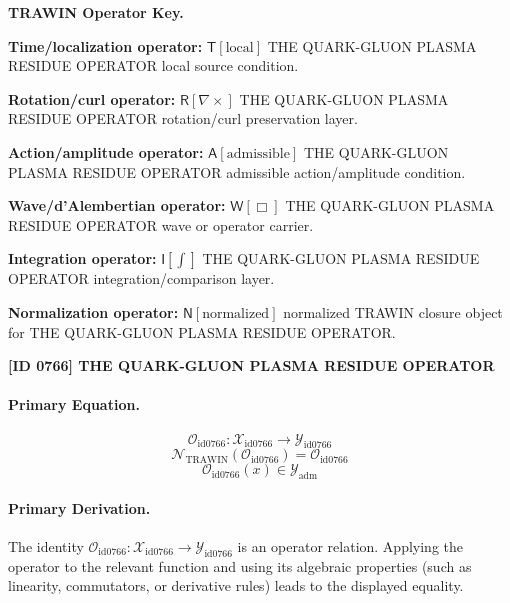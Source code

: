 \par\vspace{0.45\baselineskip}
\noindent\begin{minipage}[t]{\linewidth}
\begingroup
\small
\raggedright
\textbf{TRAWIN Operator Key.}\par
\noindent\textbf{Time/localization operator:} $\mathsf{T}\!\left[\mathrm{local}\right]$ THE QUARK-GLUON PLASMA RESIDUE OPERATOR local source condition.\par
\noindent\textbf{Rotation/curl operator:} $\mathsf{R}\!\left[\nabla\times\right]$ THE QUARK-GLUON PLASMA RESIDUE OPERATOR rotation/curl preservation layer.\par
\noindent\textbf{Action/amplitude operator:} $\mathsf{A}\!\left[\mathrm{admissible}\right]$ THE QUARK-GLUON PLASMA RESIDUE OPERATOR admissible action/amplitude condition.\par
\noindent\textbf{Wave/d'Alembertian operator:} $\mathsf{W}\!\left[\Box\right]$ THE QUARK-GLUON PLASMA RESIDUE OPERATOR wave or operator carrier.\par
\noindent\textbf{Integration operator:} $\mathsf{I}\!\left[\int\right]$ THE QUARK-GLUON PLASMA RESIDUE OPERATOR integration/comparison layer.\par
\noindent\textbf{Normalization operator:} $\mathsf{N}\!\left[\mathrm{normalized}\right]$ normalized TRAWIN closure object for THE QUARK-GLUON PLASMA RESIDUE OPERATOR.\par
\endgroup
\end{minipage}

\clearpage
\noindent\textbf{[ID 0766] THE QUARK-GLUON PLASMA RESIDUE OPERATOR}\par
\vspace{0.35em}
\paragraph{Primary Equation.}
\[
\mathcal{O}_{\mathrm{id0766}}:\mathcal{X}_{\mathrm{id0766}}\longrightarrow\mathcal{Y}_{\mathrm{id0766}}
\]
\[
\mathcal{N}_{\mathrm{TRAWIN}}(\mathcal{O}_{\mathrm{id0766}})=\mathcal{O}_{\mathrm{id0766}}
\]
\[
\mathcal{O}_{\mathrm{id0766}}(x)\in\mathcal{Y}_{\mathrm{adm}}
\]

\paragraph{Primary Derivation.}
The identity \( \mathcal{O}_{\mathrm{id0766}}:\mathcal{X}_{\mathrm{id0766}}\longrightarrow\mathcal{Y}_{\mathrm{id0766}} \) is an operator relation. Applying the operator to the relevant function and using its algebraic properties (such as linearity, commutators, or derivative rules) leads to the displayed equality.
